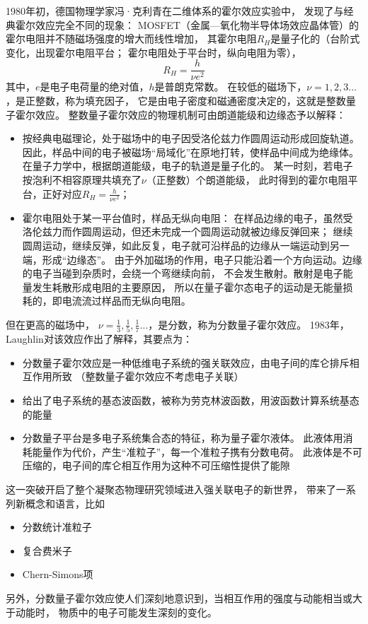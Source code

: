 \documentclass{article}
\begin{document}
1980年初，德国物理学家冯·克利青在二维体系的霍尔效应实验中，
发现了与经典霍尔效应完全不同的现象：
MOSFET（金属—氧化物半导体场效应晶体管）的霍尔电阻并不随磁场强度的增大而线性增加，
其霍尔电阻$R_H$是量子化的（台阶式变化，出现霍尔电阻平台；
霍尔电阻处于平台时，纵向电阻为零），
\begin{equation*}
    R_H=\frac{h}{\nu e^2}
\end{equation*}
其中，$e$是电子电荷量的绝对值，$h$是普朗克常数。
在较低的磁场下，$\nu=1,2,3\dots$，是正整数，称为填充因子，
它是由电子密度和磁通密度决定的，这就是整数量子霍尔效应。
整数量子霍尔效应的物理机制可由朗道能级和边缘态予以解释：
\begin{itemize}
    \item 按经典电磁理论，处于磁场中的电子因受洛伦兹力作圆周运动形成回旋轨道。
    因此，样品中间的电子被磁场“局域化”在原地打转，使样品中间成为绝缘体。
    在量子力学中，根据朗道能级，电子的轨道是量子化的。
    某一时刻，若电子按泡利不相容原理共填充了$\nu$（正整数）个朗道能级，
    此时得到的霍尔电阻平台，正好对应$R_H=\frac{h}{\nu e^2}$； 
    \item 霍尔电阻处于某一平台值时，样品无纵向电阻：
    在样品边缘的电子，虽然受洛伦兹力而作圆周运动，但还未完成一个圆周运动就被边缘反弹回来；
    继续圆周运动，继续反弹，如此反复，电子就可沿样品的边缘从一端运动到另一端，形成“边缘态”。
    由于外加磁场的作用，电子只能沿着一个方向运动。边缘的电子当碰到杂质时，会绕一个弯继续向前，
    不会发生散射。散射是电子能量发生耗散形成电阻的主要原因，
    所以在量子霍尔态电子的运动是无能量损耗的，即电流流过样品而无纵向电阻。
\end{itemize} 

但在更高的磁场中，
$\nu=\frac{1}{3},\frac{1}{5},\frac{1}{7}\dots$，是分数，称为分数量子霍尔效应。
1983年，Laughlin对该效应作出了解释，其要点为：
\begin{itemize}
    \item 分数量子霍尔效应是一种低维电子系统的强关联效应，由电子间的库仑排斥相互作用所致
     （整数量子霍尔效应不考虑电子关联）
    \item 给出了电子系统的基态波函数，被称为劳克林波函数，用波函数计算系统基态的能量
    \item 分数量子平台是多电子系统集合态的特征，称为量子霍尔液体。
    此液体用消耗能量作为代价，产生“准粒子”，每一个准粒子携有分数电荷。
    此液体是不可压缩的，电子间的库仑相互作用为这种不可压缩性提供了能隙
\end{itemize}
这一突破开启了整个凝聚态物理研究领域进入强关联电子的新世界，
带来了一系列新概念和语言，比如
\begin{itemize}
    \item 分数统计准粒子
    \item 复合费米子
    \item Chern-Simons项
\end{itemize}
另外，分数量子霍尔效应使人们深刻地意识到，当相互作用的强度与动能相当或大于动能时，
物质中的电子可能发生深刻的变化。
\end{document}
